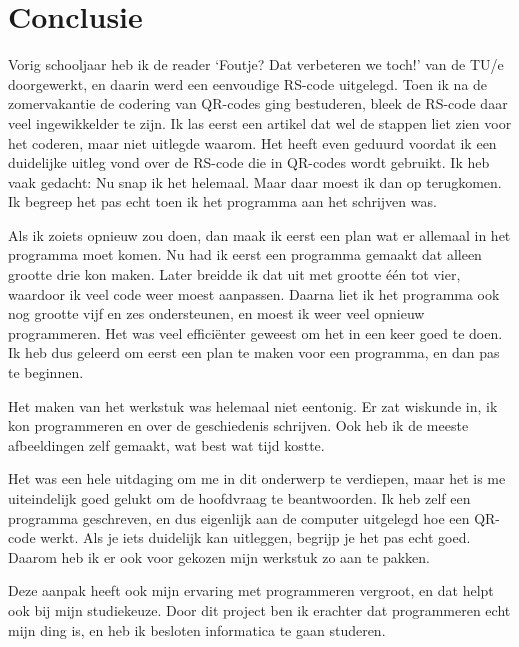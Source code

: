 \documentclass[a4paper]{article}
\begin{document}
\section{Conclusie}
Vorig schooljaar heb ik de reader `Foutje? Dat verbeteren we toch!' van de TU/e doorgewerkt, en daarin werd een eenvoudige RS-code uitgelegd. Toen ik na de zomervakantie de codering van QR-codes ging bestuderen, bleek de RS-code daar veel ingewikkelder te zijn. Ik las eerst een artikel dat wel de stappen liet zien voor het coderen, maar niet uitlegde waarom. Het heeft even geduurd voordat ik een duidelijke uitleg vond over de RS-code die in QR-codes wordt gebruikt. Ik heb vaak gedacht: Nu snap ik het helemaal. Maar daar moest ik dan op terugkomen. Ik begreep het pas echt toen ik het programma aan het schrijven was.

Als ik zoiets opnieuw zou doen, dan maak ik eerst een plan wat er allemaal in het programma moet komen. Nu had ik eerst een programma gemaakt dat alleen grootte drie kon maken. Later breidde ik dat uit met grootte één tot vier, waardoor ik veel code weer moest aanpassen. Daarna liet ik het programma ook nog grootte vijf en zes ondersteunen, en moest ik weer veel opnieuw programmeren. Het was veel efficiënter geweest om het in een keer goed te doen. Ik heb dus geleerd om eerst een plan te maken voor een programma, en dan pas te beginnen. 

Het maken van het werkstuk was helemaal niet eentonig. Er zat wiskunde in, ik kon programmeren en over de geschiedenis schrijven. Ook heb ik de meeste afbeeldingen zelf gemaakt, wat best wat tijd kostte.

Het was een hele uitdaging om me in dit onderwerp te verdiepen, maar het is me uiteindelijk goed gelukt om de hoofdvraag te beantwoorden. Ik heb zelf een programma geschreven, en dus eigenlijk aan de computer uitgelegd hoe een QR-code werkt. Als je iets duidelijk kan uitleggen, begrijp je het pas echt goed. Daarom heb ik er ook voor gekozen mijn werkstuk zo aan te pakken.

Deze aanpak heeft ook mijn ervaring met programmeren vergroot, en dat helpt ook bij mijn studiekeuze. Door dit project ben ik erachter dat programmeren echt mijn ding is, en heb ik besloten informatica te gaan studeren.

\newpage
\end{document}
